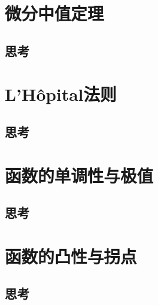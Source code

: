 \documentclass[a4paper,punct=CCT]{ctexbook}
\theoremstyle{definition}
\theoremstyle{remark}
\newif\ifshowex
\begin{document}
\section{微分中值定理}



\subsection*{思考}

\ifshowex
\currentpdfbookmark{练习}{B1.5.1.E}
\subsection*{练习}
\fi

\section{L'Hôpital法则}

\subsection*{思考}

\ifshowex
\currentpdfbookmark{练习}{B1.5.2.E}
\subsection*{练习}
\fi

\section{函数的单调性与极值}

\subsection*{思考}

\ifshowex
\currentpdfbookmark{练习}{B1.5.3.E}
\subsection*{练习}
\fi

\section{函数的凸性与拐点}

\subsection*{思考}
\end{document}
